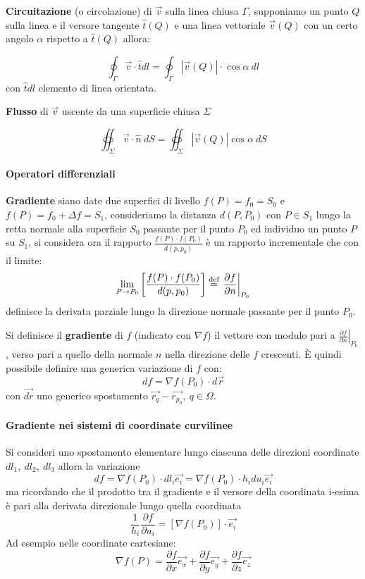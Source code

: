 \textbf{Circuitazione} (o circolazione) di $\vec{v}$ sulla linea chiusa $\Gamma$, supponiamo un punto $Q$ sulla 
linea e il versore tangente $\hat{t}(Q)$ e una linea vettoriale $\vec{v}(Q)$ con un certo angolo
$\alpha$ rispetto a $\hat{t}(Q)$ allora:

$$
\oint_{\Gamma}  \vec{v}\cdot\hat{t}dl = 
\oint_{\Gamma}  \left|\vec{v}(Q)\right|\cdot\cos\alpha\ dl
$$
con $\hat{t}dl$ elemento di linea orientata.

\textbf{Flusso} di $\vec{v}$ uscente da una superficie chiusa $\Sigma$

$$
\oiint_{\Sigma}\vec{v}\cdot\hat{n}\ dS = \oiint_{\Sigma} \left|\vec{v}(Q)\right|\cos\alpha\ dS
$$

\paragraph{Operatori differenziali}

\textbf{Gradiente} siano date due superfici di livello $f(P) = f_0 = S_0$ e
$f(P) = f_0 + \Delta f = S_1$, consideriamo la distanza $d(P,P_0)$ con 
$P\in S_1$ lungo la retta normale alla superficie $S_0$ passante per il punto 
$P_0$ ed individuo un punto $P$ su $S_1$, si considera ora il rapporto $\frac{f(P)\cdot f(P_0)}{d(p,p_0)}$ è un rapporto incrementale che con il limite:
$$
\lim_{P\to P_0} \left[\frac{f(P)\cdot f(P_0)}{d(p,p_0)}\right] \stackrel{\text{\text{def}}}{=} \left.\frac{\partial f}{\partial n}\right|_{P_0} 
$$
 definisce la derivata parziale lungo la direzione normale passante per il punto $P_0$.

Si definisce il \textbf{gradiente} di $f$ (indicato con $\nabla f$) il vettore con modulo pari a 
$\left.\frac{\partial f}{\partial n}\right|_{P_0}$, verso pari a quello della
normale $n$ nella direzione delle $f$ crescenti.
È quindi possibile definire una generica variazione di $f$ con:
$$
df = \nabla f(P_0)\cdot d\vec{r}
$$
con $\vec{dr}$ uno generico spostamento $\vec{r_q} - \vec{r_{p_0}},\ q\in\Omega$.

\paragraph{Gradiente nei sistemi di coordinate curvilinee}
Si consideri uno spostamento elementare lungo ciascuna delle direzioni coordinate
$dl_1,\ dl_2,\ dl_3$ allora la variazione
$$
df = \nabla f (P_0) \cdot dl_i\vec{e_i} = \nabla f(P_0) \cdot h_i du_i\vec{e_i} 
$$
ma ricordando che il prodotto tra il gradiente e il versore della coordinata i-esima è pari
alla derivata direzionale lungo quella coordinata
$$
\frac{1}{h_i} \frac{\partial f}{\partial u_i} = \left[\nabla f (P_0)\right]\cdot \vec{e_i}
$$
Ad esempio nelle coordinate cartesiane:
$$
\nabla f(P) = \frac{\partial f}{\partial x}\vec{e_x} + \frac{\partial f}{\partial y}\vec{e_y} + 
\frac{\partial f}{\partial z}\vec{e_z}
$$

